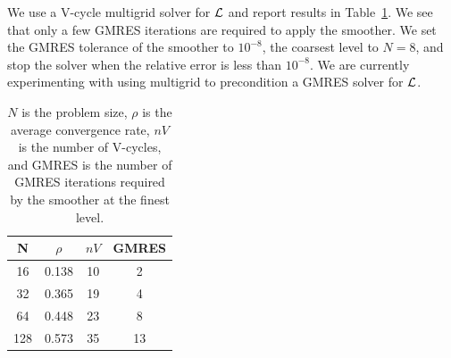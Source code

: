 \documentclass{report}
\begin{document}
We use a V-cycle multigrid solver for ${\mathcal{L}}$ and report results in
Table~\ref{t:multiSolver}. We see that only a few GMRES iterations are
required to apply the smoother. We set the GMRES tolerance of the
smoother to $10^{-8}$, the coarsest level to $N=8$, and stop the solver
when the relative error is less than $10^{-8}$. We are currently
experimenting with using multigrid to precondition a GMRES solver for
${\mathcal{L}}$.

\begin{table}[h]
\centering
\begin{tabular}{cccc}
N & $\rho$ & $nV$ & GMRES \\
\hline 16 & 0.138 & 10 & 2 \\
32 & 0.365 & 19 & 4 \\
64 & 0.448 & 23 & 8 \\
128 & 0.573 & 35 & 13 \\
\end{tabular}
\caption{\label{t:multiSolver} $N$ is the problem size, $\rho$ is the average
convergence rate, $nV$ is the number of V-cycles, and GMRES is the number
of GMRES iterations required by the smoother at the finest level.}
\end{table}
\end{document}
